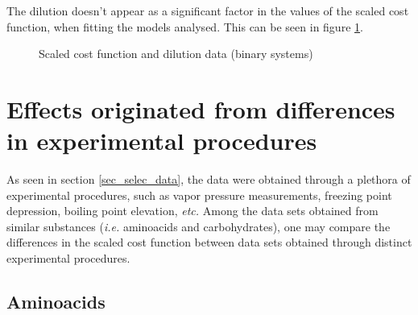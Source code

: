 \documentclass[
	12pt,				%
	openright,
	twoside,
	a4paper,			%
	brazil,			%
	french,				%
	english				%
	]{abntex2}
\begin{document}
The dilution doesn't appear as a significant factor in the values of the
scaled cost function, when fitting the models analysed. This can be seen in
figure \ref{fig_dilution_all}.

\begin{figure}[h]
	\centering
	\caption{Scaled cost function and dilution data (binary systems)}
	\label{fig_dilution_all}
\end{figure}


\section{Effects originated from differences in experimental procedures}

As seen in section \ref{sec_selec_data}, the data were obtained through
a plethora of experimental procedures, such as vapor pressure measurements,
freezing point depression, boiling point elevation, \textit{etc.} Among the
data sets obtained from similar substances (\textit{i.e.} aminoacids and
carbohydrates), one may compare the differences in the scaled cost function
between data sets obtained through distinct experimental procedures.

\subsection{Aminoacids}
\end{document}
